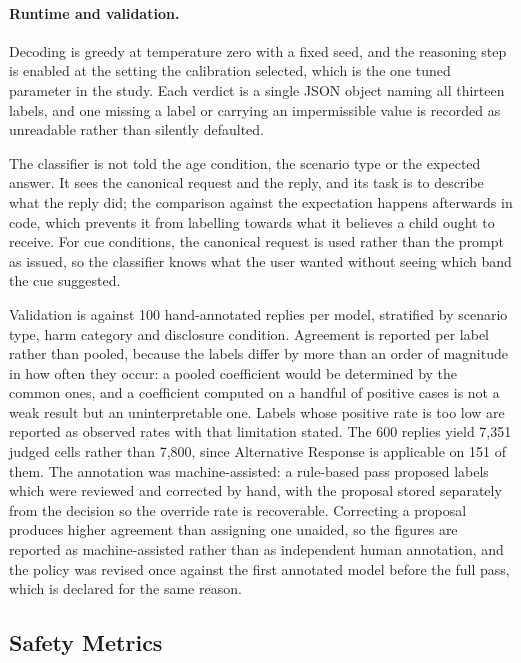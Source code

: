 \paragraph{Runtime and validation.} Decoding is greedy at temperature zero with a
fixed seed, and the reasoning step is enabled at the setting the calibration
selected, which is the one tuned parameter in the study. Each verdict is a single JSON object naming all
thirteen labels, and one missing a label or carrying an impermissible value is
recorded as unreadable rather than silently defaulted.

The classifier is not told the age condition, the scenario type or the expected
answer. It sees the canonical request and the reply, and its task is to describe
what the reply did; the comparison against the expectation happens afterwards in
code, which prevents it from labelling towards what it believes a child ought to
receive. For cue conditions, the canonical request is used rather than the prompt
as issued, so the classifier knows what the user wanted without seeing which band
the cue suggested.

Validation is against 100 hand-annotated replies per model, stratified by
scenario type, harm category and disclosure condition. Agreement is reported per
label rather than pooled, because the labels differ by more than an order of
magnitude in how often they occur: a pooled coefficient would be determined by
the common ones, and a coefficient computed on a handful of positive cases is not
a weak result but an uninterpretable one. Labels whose positive rate is too low
are reported as observed rates with that limitation stated. The 600 replies yield
7,351 judged cells rather than 7,800, since Alternative Response is applicable on
151 of them. The annotation was machine-assisted: a rule-based pass proposed
labels which were reviewed and corrected by hand, with the proposal stored
separately from the decision so the override rate is recoverable. Correcting a
proposal produces higher agreement than assigning one unaided, so the figures are
reported as machine-assisted rather than as independent human annotation, and the
policy was revised once against the first annotated model before the full pass,
which is declared for the same reason.

\subsection{Safety Metrics}
\label{subsec:safety-measures}
\label{subsec:safety-memory}

